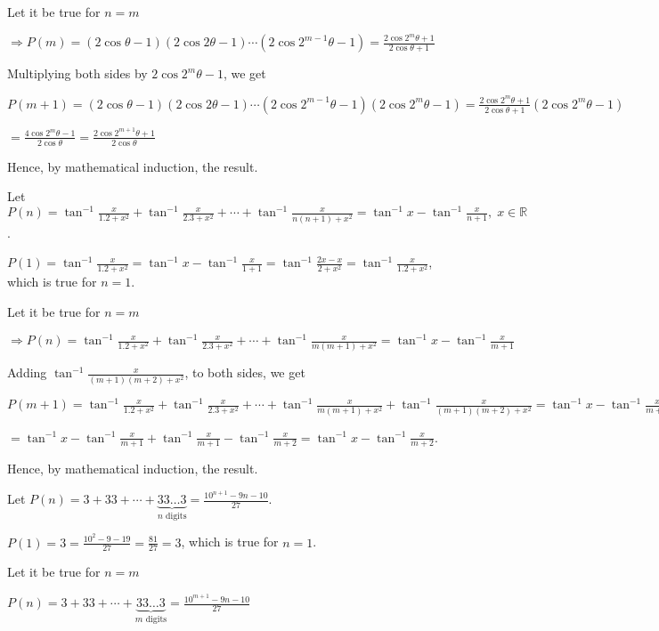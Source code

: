   Let it be true for $n = m$

  $\Rightarrow P(m) = (2\cos\theta - 1)(2\cos2\theta - 1)\cdots(2\cos2^{m - 1}\theta - 1) =
  \frac{2\cos2^m\theta + 1}{2\cos\theta + 1}$

  Multiplying both sides by $2\cos2^m\theta - 1$, we get

  $P(m + 1) = (2\cos\theta - 1)(2\cos2\theta - 1)\cdots(2\cos2^{m - 1}\theta - 1)(2\cos2^m\theta - 1) =
  \frac{2\cos2^m\theta + 1}{2\cos\theta + 1}(2\cos2^m\theta - 1)$

  $= \frac{4\cos2^m\theta - 1}{2\cos\theta} = \frac{2\cos2^{m + 1}\theta + 1}{2\cos\theta}$

  Hence, by mathematical induction, the result.
\item Let $P(n) = \tan^{-1}\frac{x}{1.2 + x^2} + \tan^{-1}\frac{x}{2.3 + x^2} + \cdots +
  \tan^{-1}\frac{x}{n(n + 1) + x^2} = \tan^{-1}x - \tan^{-1}\frac{x}{n + 1},\;x\in \mathbb{R}$.

  $P(1) = \tan^{-1}\frac{x}{1.2 + x^2} = \tan^{-1}x - \tan^{-1}\frac{x}{1 + 1} = \tan^{-1}\frac{2x - x}{2 +
    x^2} = \tan^{-1}\frac{x}{1.2 + x^2}$, which is true for $n = 1$.

  Let it be true for $n = m$

  $\Rightarrow P(n) = \tan^{-1}\frac{x}{1.2 + x^2} + \tan^{-1}\frac{x}{2.3 + x^2} + \cdots +
  \tan^{-1}\frac{x}{m(m + 1) + x^2} = \tan^{-1}x - \tan^{-1}\frac{x}{m + 1}$

  Adding $\tan^{-1}\frac{x}{(m + 1)(m + 2) + x^2}$, to both sides, we get

  $P(m + 1) = \tan^{-1}\frac{x}{1.2 + x^2} + \tan^{-1}\frac{x}{2.3 + x^2} + \cdots +
  \tan^{-1}\frac{x}{m(m + 1) + x^2} + \tan^{-1}\frac{x}{(m + 1)(m + 2) + x^2} = \tan^{-1}x -
  \tan^{-1}\frac{x}{m + 1} + \tan^{-1}\frac{x}{(m + 1)(m + 2) + x^2}$

  $= \tan^{-1}x - \tan^{-1}\frac{x}{m + 1} + \tan^{-1}\frac{x}{m +1 } - \tan^{-1}\frac{x}{m + 2} =
  \tan^{-1}x - \tan^{-1}\frac{x}{m + 2}$.

  Hence, by mathematical induction, the result.
\item Let $P(n) = 3 + 33 + \cdots + \underbrace{33\ldots3}_{n\text{~digits}} = \frac{10^{n + 1} - 9n -
  10}{27}$.

  $P(1) = 3 = \frac{10^2 - 9 - 19}{27} = \frac{81}{27} = 3$, which is true for $n = 1$.

  Let it be true for $n = m$

  $P(n) = 3 + 33 + \cdots + \underbrace{33\ldots3}_{m\text{~digits}} = \frac{10^{m + 1} - 9n -
    10}{27}$

